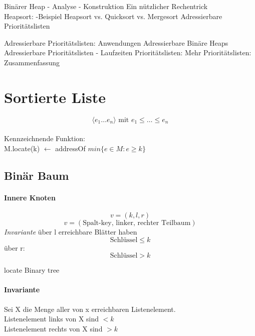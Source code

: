 \documentclass[a4paper]{scrartcl}
\begin{document}
		Binärer Heap 
		- Analyse 
		- Konstruktion 
		Ein nützlicher Rechentrick \\
		Heapsort: 
		-Beispiel 
		Heapsort vs. Quicksort vs. Mergesort 
		Adressierbare Prioritätslisten 
		
		Adressierbare Prioritätslisten: Anwendungen 
		Adressierbare Binäre Heaps 
		Adressierbare Prioritätslisten - Laufzeiten 
		Prioritätslisten: Mehr 
		Prioritätslisten: Zusammenfassung
	
	\section[Die eierlegende Wollmilchsau]{Sortierte Liste}
		\[ \langle e_1 \dots e_n \rangle  \text{ mit } e_1 \leq \dots \leq e_n \]\\
			Kennzeichnende Funktion:\\
			M.locate(k) \(\gets\) addressOf \( min \{ e \in M : e \geq k \} \)\\
	
			\subsection{Binär Baum} 
			\paragraph{Innere Knoten}
			\[v = (k, l, r)\]
			\[ v = (\text{Spalt-key, linker, rechter Teilbaum}) \]
			\emph{Invariante}
			über l erreichbare Blätter haben 
			\[ \text{Schlüssel} \leq k \] 
			über r:
			\[ \text{Schlüssel} > k \]
			
			\begin{algorithm}[H]
				\caption{locate Binary tree}
				\DontPrintSemicolon
				
			\end{algorithm}
		
			\paragraph{Invariante}
			Sei X die Menge aller von x erreichbaren Listenelement.\\
			Listenelement links von X sind \( < k \) \\
			Listenelement rechts von X sind \( >k \)\\
			
\end{document}
